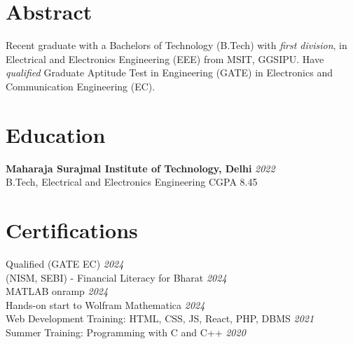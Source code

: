 \documentclass[12pt]{article}
\newcommand{\entry}[5]{{{\textbf{#1}}} \hfill \href{#5}{\faGraduationCap}\textit{#3} \\ {\footnotesize #2 \hfill #4} \\}
\newcommand{\display}[3]{\footnotesize #1 \hfill \href{#2}{\faCertificate}  \textit{#3} \\}
\begin{document}
\begin{paracol}{2}
\switchcolumn


\section{Abstract}
  \footnotesize {Recent graduate with a Bachelors of Technology (B.Tech) with \textit{first division}, in Electrical and Electronics Engineering (EEE) from MSIT, GGSIPU. Have \textit{qualified} Graduate Aptitude Test in Engineering (GATE) in Electronics and Communication Engineering (EC). } 




\section{Education}

  \entry{Maharaja Surajmal Institute of Technology, Delhi}{B.Tech, Electrical and Electronics Engineering}{2022}{CGPA 8.45}{https://drive.google.com/file/d/1-GO2GwWCt-ymG_pjoSAP-UfTh05LxCyu/view?usp=sharing}



\section{Certifications}
  \display{Qualified (GATE EC)}{https://drive.google.com/file/d/1shcvrExVXRHoQDvvzEtomb_LwSz4b1zZ/view?usp=sharing}{2024}
  \display{(NISM, SEBI) - Financial Literacy for Bharat}{https://drive.google.com/file/d/17fbsZgaEea0BV6-r4r2XJ_5Jf-J3Rga5/view?usp=sharing}{2024}
  \display{MATLAB onramp}{https://drive.google.com/file/d/1mkDalK8A1keLxXXYWNhQnshTT9sq1vor/view?usp=sharing}{2024}
  \display{Hands-on start to Wolfram Mathematica}{https://drive.google.com/file/d/1UMcH0YTn9qbdHo8LIr4tHWEiZi-Xrejt/view?usp=sharing}{2024}
  \display{Web Development Training: HTML, CSS, JS, React, PHP, DBMS}{https://drive.google.com/file/d/1BNM1FAxmFkPRrkxTPHEAF5gk_rhXNg5g/view?usp=sharing}{2021}
  \display{Summer Training: Programming with C and C++}{https://drive.google.com/file/d/190HRy9cnmwrG0kCt_TeKr5rngykm1PkW/view?usp=sharing}{2020}


\end{paracol}
\end{document}
